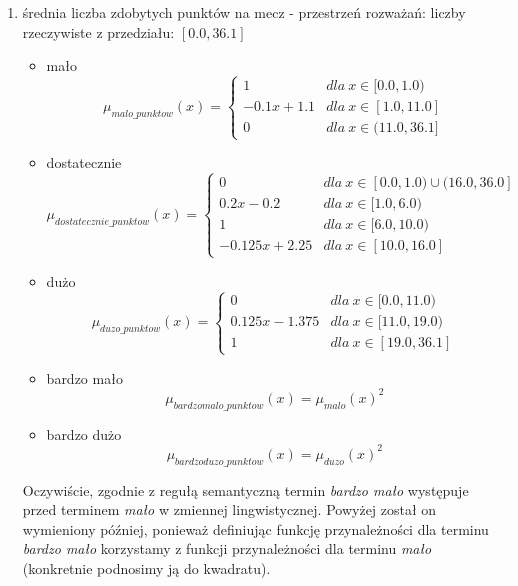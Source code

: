 \documentclass{classrep}
\begin{document}
\begin{enumerate}
    \item średnia liczba zdobytych punktów na mecz - przestrzeń rozważań: liczby rzeczywiste z przedziału: $[0.0, 36.1]$
    \begin{itemize}
        \item mało
        \begin{equation}
            \mu_{malo\_punktow}(x) = \left\{\begin{matrix} 1 & dla \: x\in[0.0, 1.0) \\ -0.1x + 1.1 & dla \: x\in [1.0, 11.0] \\ 0 & dla \: x\in (11.0, 36.1] \end{matrix}\right.
        \end{equation}
         \item dostatecznie
        \begin{equation}
            \mu_{dostatecznie\_punktow}(x) = \left\{\begin{matrix} 0 & dla \: x\in [0.0, 1.0) \cup (16.0, 36.0]  \\ 0.2x - 0.2 & dla \: x\in[1.0, 6.0) \\ 1 & dla \: x\in [6.0, 10.0) \\ -0.125x + 2.25 & dla \: x\in [10.0, 16.0] \end{matrix}\right.
        \end{equation}
        \item dużo
        \begin{equation}
            \mu_{duzo\_punktow}(x) = \left\{\begin{matrix}0 & dla \: x\in [0.0, 11.0) \\ 0.125x - 1.375 & dla \: x\in[11.0, 19.0) \\ 1 & dla \: x\in [19.0, 36.1] \end{matrix}\right.
        \end{equation}
        \item bardzo mało
        \begin{equation}
            \mu_{bardzomalo\_punktow}(x) = \mu_{malo}(x)^2
        \end{equation}
        \item bardzo dużo
        \begin{equation}
            \mu_{bardzoduzo\_punktow}(x) = \mu_{duzo}(x)^2
        \end{equation}
    \end{itemize}
    Oczywiście, zgodnie z regułą semantyczną termin \textit{bardzo mało} występuje przed terminem \textit{mało} w zmiennej lingwistycznej. Powyżej został on wymieniony później, ponieważ definiując funkcję przynależności dla terminu \textit{bardzo mało} korzystamy z funkcji przynależności dla terminu \textit{mało} (konkretnie podnosimy ją do kwadratu).

\end{enumerate}
\end{document}
